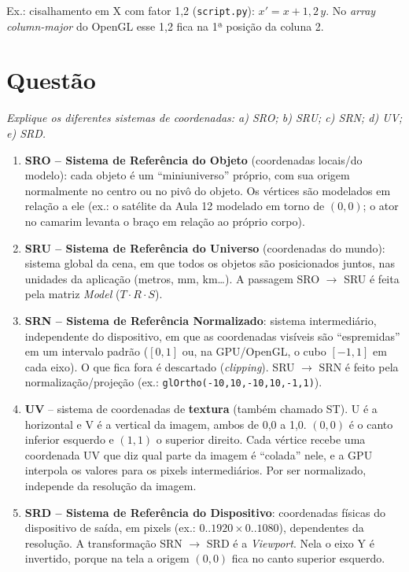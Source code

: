 \documentclass{article}
\newcounter{questao}
\newcommand{\questao}[1]{%
      \stepcounter{questao}%
      \section*{Questão \arabic{questao}}%
      \textit{#1}\par\medskip}
\begin{document}
Ex.: cisalhamento em X com fator 1,2 (\texttt{script.py}): $x' = x + 1{,}2\, y$. No \textit{array} \textit{column-major} do OpenGL esse 1,2 fica na 1ª posição da coluna 2.

\questao{Explique os diferentes sistemas de coordenadas: a) SRO; b) SRU; c) SRN; d) UV; e) SRD.}

\begin{enumerate}[label=\alph*)]
      \item \textbf{SRO -- Sistema de Referência do Objeto} (coordenadas locais/do modelo): cada objeto é um ``miniuniverso'' próprio, com sua origem normalmente no centro ou no pivô do objeto. Os vértices são modelados em relação a ele (ex.: o satélite da Aula 12 modelado em torno de $(0,0)$; o ator no camarim levanta o braço em relação ao próprio corpo).
      \item \textbf{SRU -- Sistema de Referência do Universo} (coordenadas do mundo): sistema global da cena, em que todos os objetos são posicionados juntos, nas unidades da aplicação (metros, mm, km\ldots). A passagem SRO $\rightarrow$ SRU é feita pela matriz \textit{Model} ($T \cdot R \cdot S$).
      \item \textbf{SRN -- Sistema de Referência Normalizado}: sistema intermediário, independente do dispositivo, em que as coordenadas visíveis são ``espremidas'' em um intervalo padrão ($[0,1]$ ou, na GPU/OpenGL, o cubo $[-1,1]$ em cada eixo). O que fica fora é descartado (\textit{clipping}). SRU $\rightarrow$ SRN é feito pela normalização/projeção (ex.: \texttt{glOrtho(-10,10,-10,10,-1,1)}).
      \item \textbf{UV} -- sistema de coordenadas de \textbf{textura} (também chamado ST). U é a horizontal e V é a vertical da imagem, ambos de 0,0 a 1,0. $(0,0)$ é o canto inferior esquerdo e $(1,1)$ o superior direito. Cada vértice recebe uma coordenada UV que diz qual parte da imagem é ``colada'' nele, e a GPU interpola os valores para os pixels intermediários. Por ser normalizado, independe da resolução da imagem.
      \item \textbf{SRD -- Sistema de Referência do Dispositivo}: coordenadas físicas do dispositivo de saída, em pixels (ex.: $0..1920 \times 0..1080$), dependentes da resolução. A transformação SRN $\rightarrow$ SRD é a \textit{Viewport}. Nela o eixo Y é invertido, porque na tela a origem $(0,0)$ fica no canto superior esquerdo.
\end{enumerate}
\end{document}
